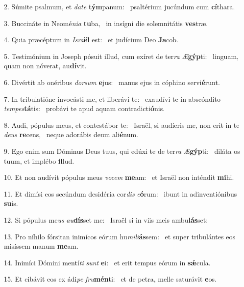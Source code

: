 2. Súmite psalmum, et \textit{da}\textit{te} \textbf{tým}panum: \ast\  psaltérium jucúndum cum \textbf{cí}thara.\

3. Buccináte in Neomé\textit{ni}\textit{a} \textbf{tu}ba, \ast\  in insígni die solemnitátis \textbf{ves}træ.\

4. Quia præcéptum in \textit{Is}\textit{ra}\textbf{ël} est: \ast\  et judícium Deo \textbf{Ja}cob.\

5. Testimónium in Joseph pósuit illud, cum exíret de ter\textit{ra} \textit{Æ}\textbf{gýp}ti: \ast\  linguam, quam non nóverat, au\textbf{dí}vit.\

6. Divértit ab onéribus \textit{dor}\textit{sum} \textbf{e}jus: \ast\  manus ejus in cóphino servi\textbf{é}runt.\

7. In tribulatióne invocásti me, et liberávi te: \dag\  exaudívi te in abscóndito \textit{tem}\textit{pes}\textbf{tá}tis: \ast\  probávi te apud aquam contradicti\textbf{ó}nis.\

8. Audi, pópulus meus, et contestábor te: \dag\  Israël, si audíeris me, non erit in te \textit{de}\textit{us} \textbf{re}cens, \ast\  neque adorábis deum ali\textbf{é}num.\

9. Ego enim sum Dóminus Deus tuus, qui edúxi te de ter\textit{ra} \textit{Æ}\textbf{gýp}ti: \ast\  diláta os tuum, et implébo \textbf{il}lud.\

10. Et non audívit pópulus meus \textit{vo}\textit{cem} \textbf{me}am: \ast\  et Israël non inténdit \textbf{mi}hi.\

11. Et dimísi eos secúndum desidéria cor\textit{dis} \textit{e}\textbf{ó}rum: \ast\  ibunt in adinventiónibus \textbf{su}is.\

12. Si pópulus me\textit{us} \textit{au}\textbf{dís}set me: \ast\  Israël si in viis meis ambu\textbf{lás}set:\

13. Pro níhilo fórsitan inimícos eórum hu\textit{mi}\textit{li}\textbf{ás}sem: \ast\  et super tribulántes eos misíssem manum \textbf{me}am.\

14. Inimíci Dómini mentí\textit{ti} \textit{sunt} \textbf{e}i: \ast\  et erit tempus eórum in \textbf{sǽ}cula.\

15. Et cibávit eos ex ádi\textit{pe} \textit{fru}\textbf{mén}ti: \ast\  et de petra, melle saturávit \textbf{e}os.\


